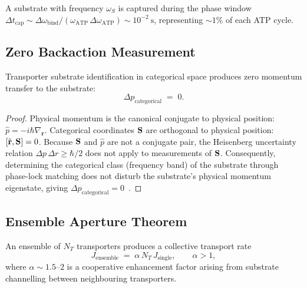 \begin{corollary}
A substrate with frequency $\omega_S$ is captured during the phase window
$\Delta t_{\mathrm{cap}}\sim\Delta\omega_{\mathrm{bind}}/
(\omega_{\mathrm{ATP}}\,\Delta\omega_{\mathrm{ATP}})\sim 10^{-2}~\mathrm{s}$,
representing $\sim 1\%$ of each ATP cycle.
\end{corollary}

\subsection{Zero Backaction Measurement}

\begin{theorem}
\label{thm:ch03-zero-backaction-transport}
Transporter substrate identification in categorical space produces zero
momentum transfer to the substrate:
\begin{equation}
    \Delta p_{\mathrm{categorical}} \;=\; 0.
    \label{eq:ch03-zero-backaction-transport}
\end{equation}
\end{theorem}

\begin{proof}
Physical momentum is the canonical conjugate to physical position:
$\hat{p}=-i\hbar\nabla_{\mathbf{r}}$.  Categorical coordinates $\mathbf{S}$
are orthogonal to physical position: $[\hat{\mathbf{r}},\mathbf{S}]=0$.
Because $\mathbf{S}$ and $\hat{p}$ are not a conjugate pair, the Heisenberg
uncertainty relation $\Delta p\,\Delta r\geq\hbar/2$ does not apply to
measurements of $\mathbf{S}$.  Consequently, determining the categorical class
(frequency band) of the substrate through phase-lock matching does not
disturb the substrate's physical momentum eigenstate, giving
$\Delta p_{\mathrm{categorical}}=0$~\citep{zurek2003decoherence}.
\end{proof}

\subsection{Ensemble Aperture Theorem}

\begin{theorem}
\label{thm:ch03-ensemble-aperture}
An ensemble of $N_T$ transporters produces a collective transport rate
\begin{equation}
    J_{\mathrm{ensemble}} \;=\; \alpha\,N_T\,J_{\mathrm{single}},
    \qquad \alpha > 1,
    \label{eq:ch03-ensemble-transport}
\end{equation}
where $\alpha\sim 1.5$--$2$ is a cooperative enhancement factor arising
from substrate channelling between neighbouring transporters.
\end{theorem}

